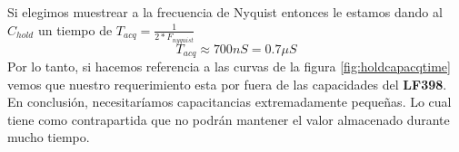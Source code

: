Si elegimos muestrear a la frecuencia de Nyquist entonces le estamos dando al $C_{hold}$ un tiempo de $T_{acq}=\frac{1}{2*F_{nyquist}}$
$$T_{acq}\approx 700nS = 0.7\mu S$$
Por lo tanto, si hacemos referencia a las curvas de la figura \ref{fig:holdcapacqtime} vemos que nuestro requerimiento esta por fuera de las capacidades del \textbf{LF398}. En conclusión, necesitaríamos capacitancias extremadamente pequeñas. Lo cual tiene como contrapartida que no podrán mantener el valor almacenado durante mucho tiempo.






  


